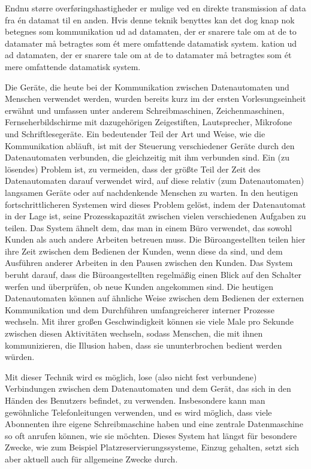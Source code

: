 {Endnu større overføringshastigheder er mulige ved en direkte transmission af data fra én datamat til en anden. Hvis denne teknik benyttes kan det dog knap nok betegnes som kommunikation ud ad datamaten, der er snarere tale om at de to datamater må betragtes som ét mere omfattende datamatisk system. kation ud ad datamaten, der er snarere tale om at de to datamater må betragtes som ét mere omfattende datamatisk system. 
}{
Die Geräte, die heute bei der Kommunikation zwischen Datenautomaten und Menschen verwendet werden, wurden bereits kurz im der ersten Vorlesungseinheit erwähnt und umfassen unter anderem Schreibmaschinen, Zeichenmaschinen, Fernseherbildschirme mit dazugehörigen Zeigestiften, Lautsprecher, Mikrofone und Schriftlesegeräte. Ein bedeutender Teil der Art und Weise, wie die Kommunikation abläuft, ist mit der Steuerung verschiedener Geräte durch den Datenautomaten verbunden, die gleichzeitig mit ihm verbunden sind. Ein (zu lösendes) Problem ist, zu vermeiden, dass der größte Teil der Zeit des Datenautomaten darauf verwendet wird, auf diese relativ (zum Datenautomaten) langsamen Geräte oder auf nachdenkende Menschen zu warten. In den heutigen fortschrittlicheren  Systemen wird dieses Problem gelöst, indem der Datenautomat in der Lage ist, seine Prozesskapazität zwischen vielen verschiedenen Aufgaben zu teilen. Das System ähnelt dem, das man in einem Büro verwendet, das sowohl Kunden als auch andere Arbeiten betreuen muss. Die Büroangestellten teilen hier ihre Zeit zwischen dem Bedienen der Kunden, wenn diese da sind, und dem Ausführen anderer Arbeiten in den Pausen zwischen den Kunden. Das System beruht darauf, dass die Büroangestellten regelmäßig einen Blick auf den Schalter werfen und überprüfen, ob neue Kunden angekommen sind. Die heutigen Datenautomaten können auf ähnliche Weise zwischen dem Bedienen der externen Kommunikation und dem Durchführen umfangreicherer interner Prozesse wechseln. Mit ihrer großen Geschwindigkeit können sie viele Male pro Sekunde zwischen diesen Aktivitäten wechseln, sodass Menschen, die mit ihnen kommunizieren, die Illusion haben, dass sie ununterbrochen bedient werden würden.

Mit dieser Technik wird es möglich, lose (also nicht fest verbundene) Verbindungen zwischen dem Datenautomaten und dem Gerät, das sich in den Händen des Benutzers befindet, zu verwenden. Insbesondere kann man gewöhnliche Telefonleitungen verwenden, und es wird möglich, dass viele Abonnenten ihre eigene Schreibmaschine haben und eine zentrale Datenmaschine so oft anrufen können, wie sie möchten. Dieses System hat längst für besondere Zwecke, wie zum Beispiel Platzreservierungssysteme, Einzug gehalten, setzt sich aber aktuell auch für allgemeine Zwecke durch.

}
